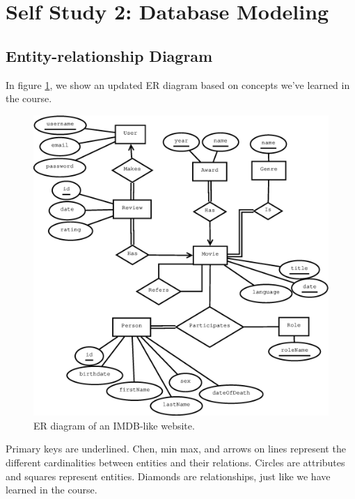 \section{Self Study 2: Database Modeling}

\subsection{Entity-relationship Diagram}
In figure \ref{fig:ss2-ERdiagram}, we show an updated ER diagram based on concepts we've learned in the course.
\begin{figure}[h]
  \centering
  \includegraphics[width=\linewidth]{2-17.02.14/ERDiagram.eps}
  \caption{ER diagram of an IMDB-like website.}\label{fig:ss2-ERdiagram}
\end{figure}

Primary keys are underlined. Chen, min max, and arrows on lines represent the different cardinalities between entities and their relations. Circles are attributes and squares represent entities. Diamonds are relationships, just like we have learned in the course. 

